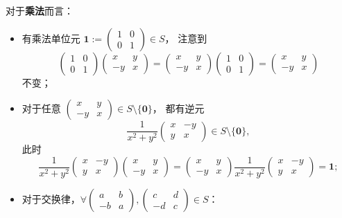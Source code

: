 \begin{question}
\begin{solution}
对于\textbf{乘法}而言：
\begin{itemize}
  \item 有乘法单位元 \(\mathbf{1}:=\begin{pmatrix}1&0\\0&1\end{pmatrix}\in S\)，
  注意到
  \[
  \begin{pmatrix}1&0\\0&1\end{pmatrix}\begin{pmatrix}x&y\\-y&x\end{pmatrix}
  =\begin{pmatrix}x&y\\-y&x\end{pmatrix}\begin{pmatrix}1&0\\0&1\end{pmatrix}
  =\begin{pmatrix}x&y\\-y&x\end{pmatrix}
  \]
  不变；
  \item 对于任意 \(\begin{pmatrix}x&y\\-y&x\end{pmatrix}\in S\setminus\{\mathbf{0}\}\)，
  都有逆元
  \[
  \frac{1}{x^2+y^2}\begin{pmatrix}x&-y\\y&x\end{pmatrix}\in S\setminus\{\mathbf{0}\},
  \]
  此时
  \[
  \frac{1}{x^2+y^2}\begin{pmatrix}x&-y\\y&x\end{pmatrix}
  \begin{pmatrix}x&y\\-y&x\end{pmatrix}
  =\begin{pmatrix}x&y\\-y&x\end{pmatrix}
  \frac{1}{x^2+y^2}\begin{pmatrix}x&-y\\y&x\end{pmatrix}
  =\mathbf{1};
  \]
  \item 对于交换律，\(\forall\begin{pmatrix}a&b\\-b&a\end{pmatrix},
  \begin{pmatrix}c&d\\-d&c\end{pmatrix}\in S\)：

\end{itemize}
\end{solution}
\end{question}
